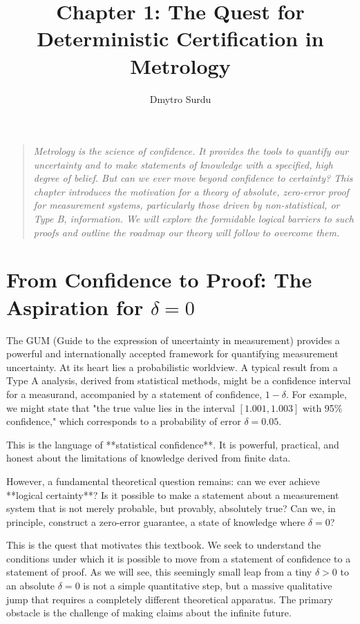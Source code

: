 \documentclass[12pt]{article}
\title{\textbf{Chapter 1: The Quest for Deterministic Certification in Metrology}}
\author{Dmytro Surdu}
\date{}
\begin{document}
\maketitle

\begin{quote}
\textit{Metrology is the science of confidence. It provides the tools to quantify our uncertainty and to make statements of knowledge with a specified, high degree of belief. But can we ever move beyond confidence to certainty? This chapter introduces the motivation for a theory of absolute, zero-error proof for measurement systems, particularly those driven by non-statistical, or Type B, information. We will explore the formidable logical barriers to such proofs and outline the roadmap our theory will follow to overcome them.}
\end{quote}

\section{From Confidence to Proof: The Aspiration for $\delta=0$}

The GUM (Guide to the expression of uncertainty in measurement) provides a powerful and internationally accepted framework for quantifying measurement uncertainty. At its heart lies a probabilistic worldview. A typical result from a Type A analysis, derived from statistical methods, might be a confidence interval for a measurand, accompanied by a statement of confidence, $1-\delta$. For example, we might state that "the true value lies in the interval $[1.001, 1.003]$ with 95\% confidence," which corresponds to a probability of error $\delta=0.05$.

This is the language of **statistical confidence**. It is powerful, practical, and honest about the limitations of knowledge derived from finite data.

However, a fundamental theoretical question remains: can we ever achieve **logical certainty**? Is it possible to make a statement about a measurement system that is not merely probable, but provably, absolutely true? Can we, in principle, construct a zero-error guarantee, a state of knowledge where $\delta=0$?

This is the quest that motivates this textbook. We seek to understand the conditions under which it is possible to move from a statement of confidence to a statement of proof. As we will see, this seemingly small leap from a tiny $\delta > 0$ to an absolute $\delta = 0$ is not a simple quantitative step, but a massive qualitative jump that requires a completely different theoretical apparatus. The primary obstacle is the challenge of making claims about the infinite future.
\end{document}
